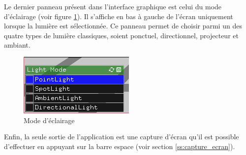Le dernier panneau présent dans l'interface graphique est celui du mode d'éclairage (voir figure \ref{fig:mode_eclairage}).
Il s'affiche en bas à gauche de l'écran uniquement lorsque la lumière est sélectionnée.
Ce panneau permet de choisir parmi un des quatre types de lumière classiques, soient ponctuel, directionnel, projecteur et ambiant.

\begin{figure}[H]
    \centering
	\includegraphics[scale=0.8]{fig/lightmode.png}
	\caption{Mode d'éclairage}
	\label{fig:mode_eclairage}
\end{figure}

Enfin, la seule sortie de l'application est une capture d'écran qu'il est possible d'effectuer en appuyant sur la barre espace (voir section \ref{ss:capture_ecran}).
\clearpage
